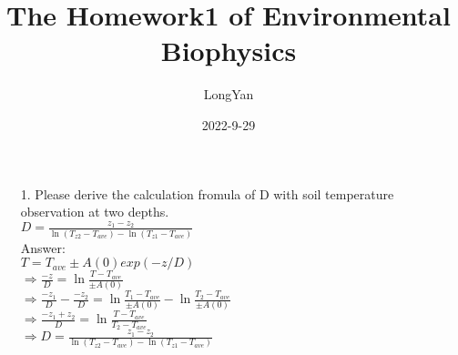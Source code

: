 \documentclass{article}
\title{The Homework1 of Environmental Biophysics}
\author{LongYan}
\date{2022-9-29}
\begin{document}
\maketitle
\begin{enumerate}
    \item[1.] 
    Please derive the calculation fromula of D with soil temperature observation at two depths.\\
    $D=\frac{z_{1}-z_{2}}{\ln{(T_{z2}-T_{ave})}-\ln{(T_{z1}-T_{ave})}}$\\
    Answer:\\$T = T_{ave} \pm A(0)exp(-z/D)$\\
    $\Rightarrow \frac{-z}{D} = \ln\frac{T-T_{ave}}{\pm A(0)}$\\ 
    $\Rightarrow \frac{-z_{1}}{D} - \frac{-z_{2}}{D} = \ln\frac{T_{1}-T_{ave}}{\pm A(0)} - \ln\frac{T_{2}-T_{ave}}{\pm A(0)}$\\
    $\Rightarrow \frac{-z_{1}+z_{2}}{D} = \ln\frac{T-T_{ave}}{T_{2}-T_{ave}}$\\
    $\Rightarrow D=\frac{z_{1}-z_{2}}{\ln{(T_{z2}-T_{ave})}-\ln{(T_{z1}-T_{ave})}}$\\
\end{enumerate}
\end{document}
